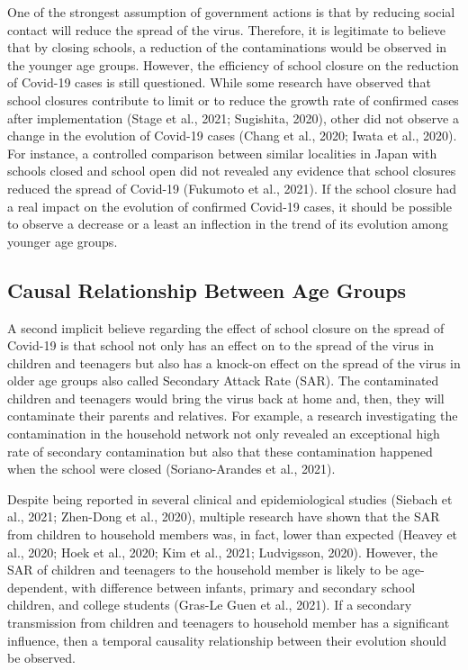 \documentclass[]{elsarticle} %
\begin{document}
One of the strongest assumption of government actions is that by
reducing social contact will reduce the spread of the virus. Therefore,
it is legitimate to believe that by closing schools, a reduction of the
contaminations would be observed in the younger age groups. However, the
efficiency of school closure on the reduction of Covid-19 cases is still
questioned. While some research have observed that school closures
contribute to limit or to reduce the growth rate of confirmed cases
after implementation (Stage et al., 2021; Sugishita, 2020), other did
not observe a change in the evolution of Covid-19 cases (Chang et al.,
2020; Iwata et al., 2020). For instance, a controlled comparison between
similar localities in Japan with schools closed and school open did not
revealed any evidence that school closures reduced the spread of
Covid-19 (Fukumoto et al., 2021). If the school closure had a real
impact on the evolution of confirmed Covid-19 cases, it should be
possible to observe a decrease or a least an inflection in the trend of
its evolution among younger age groups.

\hypertarget{causal-relationship-between-age-groups}{%
\subsection{Causal Relationship Between Age
Groups}\label{causal-relationship-between-age-groups}}

A second implicit believe regarding the effect of school closure on the
spread of Covid-19 is that school not only has an effect on to the
spread of the virus in children and teenagers but also has a knock-on
effect on the spread of the virus in older age groups also called
Secondary Attack Rate (SAR). The contaminated children and teenagers
would bring the virus back at home and, then, they will contaminate
their parents and relatives. For example, a research investigating the
contamination in the household network not only revealed an exceptional
high rate of secondary contamination but also that these contamination
happened when the school were closed (Soriano-Arandes et al., 2021).

Despite being reported in several clinical and epidemiological studies
(Siebach et al., 2021; Zhen-Dong et al., 2020), multiple research have
shown that the SAR from children to household members was, in fact,
lower than expected (Heavey et al., 2020; Hoek et al., 2020; Kim et al.,
2021; Ludvigsson, 2020). However, the SAR of children and teenagers to
the household member is likely to be age-dependent, with difference
between infants, primary and secondary school children, and college
students (Gras-Le Guen et al., 2021). If a secondary transmission from
children and teenagers to household member has a significant influence,
then a temporal causality relationship between their evolution should be
observed.
\end{document}
